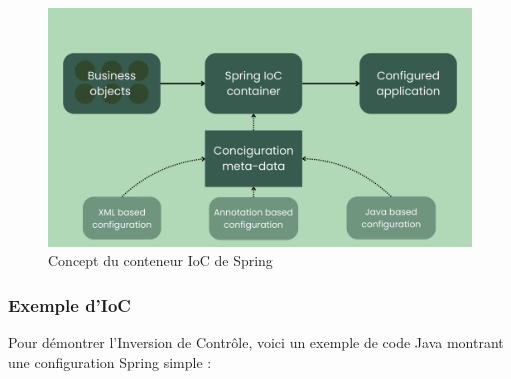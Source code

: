 \documentclass{article}
\begin{document}
\begin{figure}[H]
    \centering
    \begin{framed}
        \includegraphics[width=0.9\linewidth]{images/sspring_ioc_container.png}
    \end{framed}
    \caption{Concept du conteneur IoC de Spring}
    \label{fig:spring-ioc-container}
\end{figure}

\subsubsection{Exemple d'IoC}

Pour démontrer l'Inversion de Contrôle, voici un exemple de code Java montrant une configuration Spring simple :
\end{document}
